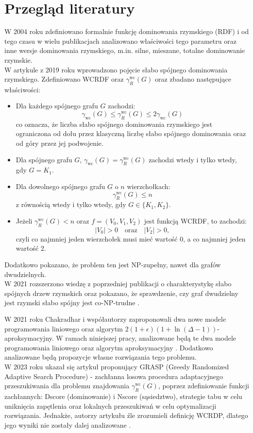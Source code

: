 \section{Przegląd literatury}
W 2004 roku zdefiniowano formalnie funkcję dominowania rzymskiego (RDF) \cite{RDF} i od tego czasu w wielu publikacjach analizowano właściwości tego parametru oraz inne wersje dominowania rzymskiego, m.in. silne, mieszane, totalne dominowanie rzymskie.\\ 
W artykule z 2019 roku \cite{theoryWCRDF} wprowadzono pojęcie słabo spójnego dominowania rzymskiego. Zdefiniowano WCRDF oraz $\gamma_{R}^{\text{wc}}(G)$ oraz zbadano następujące właściwości:
\begin{itemize}
    \item Dla każdego spójnego grafu $G$ zachodzi:
    \[
    \gamma_{\text{wc}}(G) \leq \gamma_{R}^{\text{wc}}(G) \leq 2\gamma_{\text{wc}}(G)
    \]
    co oznacza, że liczba słabo spójnego dominowania rzymskiego jest ograniczona od dołu przez klasyczną liczbę słabo spójnego dominowania oraz od góry przez jej podwojenie.

    \item Dla spójnego grafu $G$, $\gamma_{\text{wc}}(G) = \gamma_{R}^{\text{wc}}(G)$ zachodzi wtedy i tylko wtedy, gdy $G = K_1$.

    \item Dla dowolnego spójnego grafu $G$ o $n$ wierzchołkach:
    \[
    \gamma_{R}^{\text{wc}}(G) \leq n
    \]
    z równością wtedy i tylko wtedy, gdy $G \in \{K_1, K_2\}$.

    \item Jeżeli $\gamma_{R}^{\text{wc}}(G) < n$ oraz $f = (V_0, V_1, V_2)$ jest funkcją WCRDF, to zachodzi:
    \[
    |V_0| > 0 \quad \text{oraz} \quad |V_2| > 0,
    \] 
    czyli co najmniej jeden wierzchołek musi mieć wartość 0, a co najmniej jeden wartość 2.
\end{itemize}
Dodatkowo pokazano, że problem ten jest NP-zupełny, nawet dla grafów dwudzielnych.\\
W 2021 rozszerzono wiedzę z poprzedniej publikacji o charakterystykę słabo spójnych drzew rzymskich oraz pokazano, że sprawdzenie, czy graf dwudzielny jest rzymski słabo spójny jest co-NP-trudne \cite{PROGRESS}.

W 2021 roku Chakradhar i współautorzy zaproponowali dwa nowe modele programowania liniowego oraz algorytm $2(1+\epsilon)(1 + \ln(\Delta - 1))$-aproksymacyjny. W ramach niniejszej pracy, analizowane będą te dwa modele programowania liniowego oraz algorytm aproksymacyjny \cite{ILP}. Dodatkowo analizowane będą propozycje własne rozwiązania tego problemu.\\
W 2023 roku ukazał się artykuł proponujący GRASP (Greedy Randomized Adaptive Search Procedure) - zachłanna losowa procedura adaptacyjnego przeszukiwania dla problemu znajdowania $\gamma_{R}^{\text{wc}}(G)$, poprzez zdefiniowanie funkcji zachłannych: Dscore (dominowanie) i Nscore (sąsiedztwo), strategie tabu w celu uniknięcia zapętlenia oraz lokalnych przeszukiwań w celu optymalizacji rozwiązania. Jednakże, autorzy artykułu źle zrozumieli definicję WCRDP, dlatego jego wyniki nie zostały dalej analizowane \cite{GRASP}.

